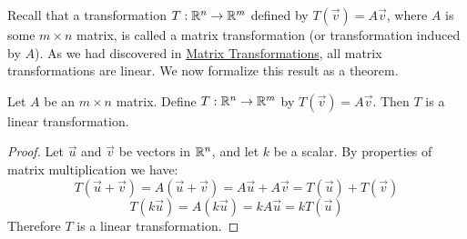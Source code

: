 \documentclass{ximera}
\begin{document}


Recall that a transformation $T:\mathbb{R}^n\rightarrow\mathbb{R}^m$ defined by $T(\vec{v})=A\vec{v}$, where $A$ is some $m\times n$ matrix, is called a matrix transformation (or transformation induced by $A$).  As we had discovered in \href{https://ximera.osu.edu/oerlinalg/LinearAlgebra/LTR-0005/main}{Matrix Transformations}, all matrix transformations are linear.  We now formalize this result as a theorem.

 \begin{theorem}\label{th:matrixtran} Let $A$ be an $m\times n$ matrix.  Define $T:\mathbb{R}^n\rightarrow\mathbb{R}^m$ by $T(\vec{v})=A\vec{v}$.  Then $T$ is a linear transformation.
\end{theorem}

\begin{proof}  Let $\vec{u}$ and $\vec{v}$ be vectors in $\mathbb{R}^n$, and let $k$ be a scalar.  By properties of matrix multiplication we have:
$$T(\vec{u}+\vec{v})=A(\vec{u}+\vec{v})=A\vec{u}+A\vec{v}=T(\vec{u})+T(\vec{v})$$
$$T(k\vec{u})=A(k\vec{u})=kA\vec{u}=kT(\vec{u})$$
Therefore $T$ is a linear transformation.
\end{proof}
\end{document}

